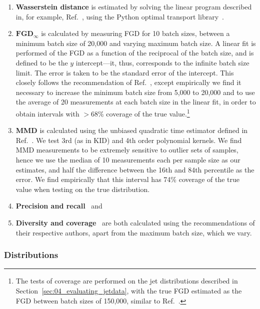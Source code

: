 \begin{enumerate}
    \item \textbf{Wasserstein distance} is estimated by solving the linear program described in, for example, Ref.~\cite{bertsimas_linearopt}, using the Python optimal transport library~\cite{flamary_pot}.
    \item $\mathbf{\textbf{FGD}}_\infty$ is calculated by measuring FGD for 10 batch sizes, between a minimum batch size of 20,000 and varying maximum batch size. 
    A linear fit is performed of the FGD as a function of the reciprocal of the batch size, and \fgdinf is defined to be the $y$ intercept---it, thus, corresponds to the infinite batch size limit.
    The error is taken to be the standard error of the intercept.
    This closely follows the recommendation of Ref.~\cite{chong_unbiasedfid}, except empirically we find it necessary to increase the minimum batch size from 5,000 to 20,000 and to use the average of 20 measurements at each batch size in the linear fit, in order to obtain \fgdinf intervals with $>$68\% coverage of the true value.\footnote{The tests of coverage are performed on the jet distributions described in Section~\ref{sec:04_evaluating_jetdata}, with the true FGD estimated as the FGD between batch sizes of 150,000, similar to Ref.~\cite{chong_unbiasedfid}.}
    \item \textbf{MMD} is calculated using the unbiased quadratic time estimator defined in Ref.~\cite{gretton_mmd}. 
    We test 3rd (as in KID) and 4th order polynomial kernels.
    We find MMD measurements to be extremely sensitive to outlier sets of samples, hence we use the median of 10 measurements each per sample size as our estimates, and half the difference between the 16th and 84th percentile as the error.
    We find empirically that this interval has 74\% coverage of the true value when testing on the true distribution.
    \item \textbf{Precision and recall}~\cite{kynkaanniemi_pr} and
    \item \textbf{Diversity and coverage}~\cite{naeem_dc} are both calculated using the recommendations of their respective authors, apart from the maximum batch size, which we vary.
\end{enumerate}

\subsubsection{Distributions}
\label{sec:04_evaluating_toydata_distributions}

